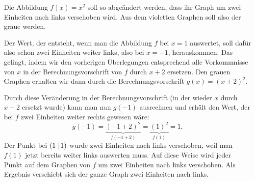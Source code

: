 \documentclass[../../main.tex]{subfiles}
\begin{document}
\begin{example}{}
    Die Abbildung $f(x)=x^2$ soll so abgeändert werden, dass ihr Graph um zwei Einheiten nach links verschoben wird. Aus dem violetten Graphen soll also der graue werden.
    \begin{center}
    \end{center}
    Der Wert, der entsteht, wenn man die Abbildung $f$ bei $x=1$ auswertet, soll dafür also schon zwei Einheiten weiter links, also bei $x=-1$, herauskommen. Das gelingt, indem wir den vorherigen Überlegungen entsprechend alle Vorkommnisse von $x$ in der Berechnungsvorschrift von $f$ durch $x+2$ ersetzen. Den grauen Graphen erhalten wir dann durch die Berechnungsvorschrift $g(x)=(x+2)^2$. 
    
    Durch diese Veränderung in der Berechnungsvorschrift (in der wieder $x$ durch $x+2$ ersetzt wurde) kann man nun $g(-1)$ ausrechnen und erhält den Wert, der bei $f$ zwei Einheiten weiter rechts gewesen wäre:
    \[g(-1)=\underbrace{(-1+2)^2}_{f(-1+2)}=\underbrace{(1)^2}_{f(1)}=1.\]
    Der Punkt bei $\left(1 \:\middle|\: 1\right)$ wurde zwei Einheiten nach links verschoben, weil man $f(1)$ jetzt bereits weiter links auswerten muss. Auf diese Weise wird jeder Punkt auf dem Graphen von $f$ um zwei Einheiten nach links verschoben. Als Ergebnis verschiebt sich der ganze Graph zwei Einheiten nach links.
\end{example}
\end{document}
